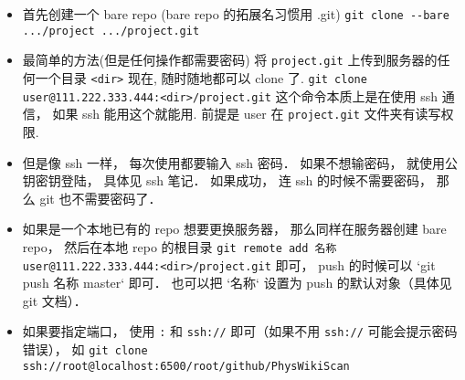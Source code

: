 
\begin{issues}
\issueDraft
\end{issues}


\begin{itemize}
\item 首先创建一个 bare repo (bare repo 的拓展名习惯用 .git)
\verb|git clone --bare .../project .../project.git|

\item 最简单的方法(但是任何操作都需要密码)
将 \verb|project.git| 上传到服务器的任何一个目录 \verb|<dir>|
现在, 随时随地都可以 clone 了.
\verb`git clone user@111.222.333.444:<dir>/project.git`
这个命令本质上是在使用 ssh 通信， 如果 ssh 能用这个就能用.
前提是 user 在 \verb|project.git| 文件夹有读写权限.

\item 但是像 ssh 一样， 每次使用都要输入 ssh 密码． 如果不想输密码， 就使用公钥密钥登陆， 具体见 ssh 笔记． 如果成功， 连 ssh 的时候不需要密码， 那么 git 也不需要密码了．

\item 如果是一个本地已有的 repo 想要更换服务器， 那么同样在服务器创建 bare repo， 然后在本地 repo 的根目录 \verb`git remote add 名称 user@111.222.333.444:<dir>/project.git` 即可， push 的时候可以 `git push 名称 master` 即可． 也可以把 `名称` 设置为 push 的默认对象（具体见 git 文档）．

\item 如果要指定端口， 使用 \verb`:` 和 \verb`ssh://` 即可（如果不用 \verb`ssh://` 可能会提示密码错误）， 如 \verb`git clone ssh://root@localhost:6500/root/github/PhysWikiScan`
\end{itemize}
